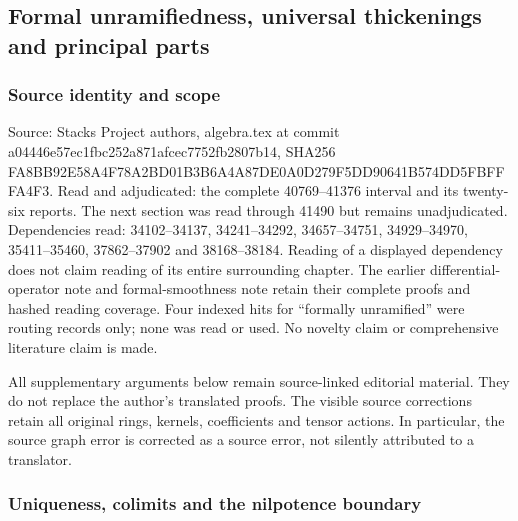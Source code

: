 \subsection{Formal unramifiedness, universal thickenings and principal parts}\label{algebra-proof-055-formal-unramifiedness-universal-thickenings-and-principal-parts}

\subsubsection{Source identity and scope}\label{algebra-proof-055-source-identity-and-scope}

Source: Stacks Project authors, algebra.tex at commit a044\allowbreak{}46e5\allowbreak{}7ec1\allowbreak{}fbc2\allowbreak{}52a8\allowbreak{}71af\allowbreak{}cec7\allowbreak{}752f\allowbreak{}b280\allowbreak{}7b14, SHA256 FA8B\allowbreak{}B92E\allowbreak{}58A4\allowbreak{}F78A\allowbreak{}2BD0\allowbreak{}1B3B\allowbreak{}6A4A\allowbreak{}87DE\allowbreak{}0A0D\allowbreak{}279F\allowbreak{}5DD9\allowbreak{}0641\allowbreak{}B574\allowbreak{}DD5F\allowbreak{}BFFF\allowbreak{}A4F3. Read and adjudicated: the complete 40769--41376 interval and its twenty-six reports. The next section was read through 41490 but remains unadjudicated. Dependencies read: 34102--34137, 34241--34292, 34657--34751, 34929--34970, 35411--35460, 37862--37902 and 38168--38184. Reading of a displayed dependency does not claim reading of its entire surrounding chapter. The earlier differential-operator note and formal-smoothness note retain their complete proofs and hashed reading coverage. Four indexed hits for ``formally unramified'' were routing records only; none was read or used. No novelty claim or comprehensive literature claim is made.

All supplementary arguments below remain source-linked editorial material. They do not replace the author's translated proofs. The visible source corrections retain all original rings, kernels, coefficients and tensor actions. In particular, the source graph error is corrected as a source error, not silently attributed to a translator.

\subsubsection{Uniqueness, colimits and the nilpotence boundary}\label{algebra-proof-055-uniqueness-colimits-and-the-nilpotence-boundary}

